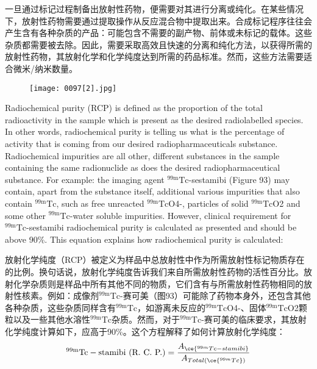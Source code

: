 \documentclass[dvipsnames, svgnames,a4paper,11pt]{article}
\begin{document}
一旦通过标记过程制备出放射性药物，便需要对其进行分离或纯化。在某些情况下，放射性药物需要通过提取操作从反应混合物中提取出来。合成标记程序往往会产生含有各种杂质的产品：可能包含不需要的副产物、前体或未标记的载体。这些杂质都需要被去除。因此，需要采取高效且快速的分离和纯化方法，以获得所需的放射性药物，其放射化学和化学纯度达到所需的药品标准。然而，这些方法需要适合微米/纳米数量。

\begin{wrapfigure}{r}{0.3\textwidth}
      \centering
      \texttt{[image: 0097[2].jpg]}
       \label{fig93}
  \end{wrapfigure}

Radiochemical purity (RCP) is defined as the
proportion of the total radioactivity in the sample
which is present as the desired radiolabelled
species. In other words, radiochemical purity is
telling us what is the percentage of activity that is
coming from our desired radiopharmaceuticals
substance. Radiochemical impurities are all other,
different substances in the sample containing the
same radionuclide as does the desired
radiopharmaceutical substance. For example:
the imaging agent ${}^\mathrm{99m}\mathrm{Tc}$-sestamibi (Figure 93) may contain, apart from the
substance itself, additional various impurities that also contain ${}^\mathrm{99m}\mathrm{Tc}$, such as free
unreacted ${}^\mathrm{99m}\mathrm{Tc}$O4-, particles of solid ${}^\mathrm{99m}\mathrm{Tc}$O2 and some other ${}^\mathrm{99m}\mathrm{Tc}$-water soluble
impurities. However, clinical requirement for ${}^\mathrm{99m}\mathrm{Tc}$-sestamibi radiochemical purity is
calculated as presented and should be above 90\%. This equation explains how
radiochemical purity is calculated:

放射化学纯度（RCP）被定义为样品中总放射性中作为所需放射性标记物质存在的比例。换句话说，放射化学纯度告诉我们来自所需放射性药物的活性百分比。放射化学杂质则是样品中所有其他不同的物质，它们含有与所需放射性药物相同的放射性核素。例如：成像剂${}^\mathrm{99m}\mathrm{Tc}$-赛可美（图93）可能除了药物本身外，还包含其他各种杂质，这些杂质同样含有${}^\mathrm{99m}\mathrm{Tc}$，如游离未反应的${}^\mathrm{99m}\mathrm{Tc}$O4-、固体${}^\mathrm{99m}\mathrm{Tc}$O2颗粒以及一些其他水溶性${}^\mathrm{99m}\mathrm{Tc}$杂质。然而，对于${}^\mathrm{99m}\mathrm{Tc}$-赛可美的临床要求，其放射化学纯度计算如下，应高于90\%。这个方程解释了如何计算放射化学纯度：
$$\mathrm{^{99m}Tc}- \text{stamibi (R. C. P.)} = \frac{A_{\ce{^{99m}Tc-stamibi}}}{A_{Total(\ce{^{99m}Tc})}} 
$$
\end{document}
